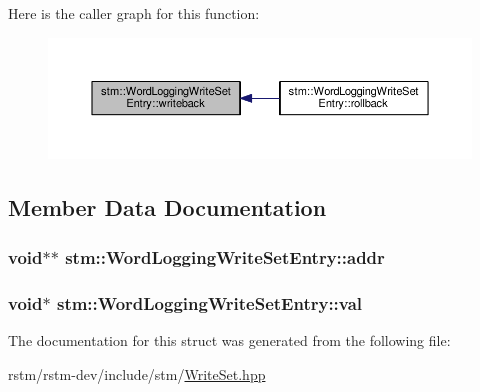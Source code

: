 Here is the caller graph for this function\-:
\nopagebreak
\begin{figure}[H]
\begin{center}
\leavevmode
\includegraphics[width=350pt]{structstm_1_1WordLoggingWriteSetEntry_a4b364b08c9dd468cb76b4a6cc99a97f4_icgraph}
\end{center}
\end{figure}




\subsection{Member Data Documentation}
\hypertarget{structstm_1_1WordLoggingWriteSetEntry_acc06b16d9ca580dc91e03d658e05d05d}{
\subsubsection[{addr}]{\setlength{\rightskip}{0pt plus 5cm}void$\ast$$\ast$ stm\-::\-Word\-Logging\-Write\-Set\-Entry\-::addr}}\label{structstm_1_1WordLoggingWriteSetEntry_acc06b16d9ca580dc91e03d658e05d05d}
\hypertarget{structstm_1_1WordLoggingWriteSetEntry_a6f319c5758cc820fb62749bbef45697c}{
\subsubsection[{val}]{\setlength{\rightskip}{0pt plus 5cm}void$\ast$ stm\-::\-Word\-Logging\-Write\-Set\-Entry\-::val}}\label{structstm_1_1WordLoggingWriteSetEntry_a6f319c5758cc820fb62749bbef45697c}


The documentation for this struct was generated from the following file\-:\begin{DoxyCompactItemize}
\item 
rstm/rstm-\/dev/include/stm/\hyperlink{WriteSet_8hpp}{Write\-Set.\-hpp}\end{DoxyCompactItemize}
